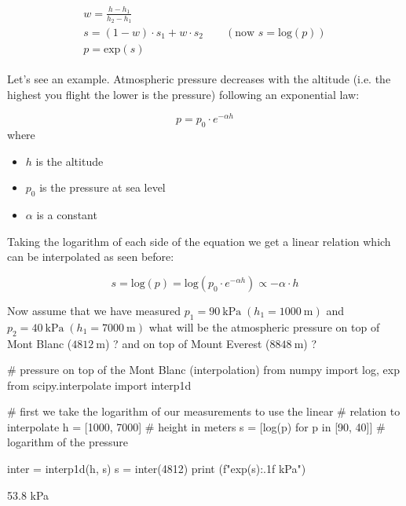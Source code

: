 \begin{align}
\label{eq:log_interp}
\begin{gathered}
w = \frac{h - h_1}{h_2 - h_1} \\
s = (1 - w)\cdot s_1 + w \cdot s_2\qquad (\textrm{now } s = \textrm{log}(p))\\
p = \textrm{exp}(s)
\end{gathered}
\end{align}

Let's see an example. Atmospheric pressure decreases with the altitude (i.e. the highest you flight the lower is the pressure) following an exponential law:

\begin{equation}
p = p_0\cdot e^{-\alpha h}
\end{equation}
where
\begin{itemize}
\tightlist
\item $h$ is the altitude
\item $p_0$ is the pressure at sea level
\item $\alpha$ is a constant
\end{itemize}

Taking the logarithm of each side of the equation we get a linear relation which can be interpolated as seen before:

\begin{equation}
s = \mathrm{log}(p) = \mathrm{log}(p_0\cdot e^{-\alpha h})\propto - \alpha \cdot h
\end{equation}

Now assume that we have measured
$p_1 = 90~\mathrm{kPa}\;(h_1 = 1000~\mathrm{m})$ and $p_2 = 40~\mathrm{kPa}\;(h_1 = 7000~\mathrm{m})$ what will be the atmospheric pressure on top of Mont Blanc ($4812~\mathrm{m}$) ? and on top of Mount Everest ($8848~\mathrm{m}$) ?

\begin{ipython}
# pressure on top of the Mont Blanc (interpolation)
from numpy import log, exp
from scipy.interpolate import interp1d

# first we take the logarithm of our measurements to use the linear
# relation to interpolate
h = [1000, 7000] # height in meters
s = [log(p) for p in [90, 40]] # logarithm of the pressure

inter = interp1d(h, s)
s = inter(4812)
print (f"{exp(s):.1f} kPa")
\end{ipython}
\begin{ioutput}
53.8 kPa
\end{ioutput}

